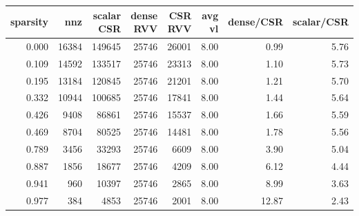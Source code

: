 \begin{tabular}{rrrrrrrr}
\toprule
sparsity & nnz & scalar CSR & dense RVV & CSR RVV & avg vl & dense/CSR & scalar/CSR \\
\midrule
0.000 & 16384 & 149645 & 25746 & 26001 & 8.00 & 0.99 & 5.76 \\
0.109 & 14592 & 133517 & 25746 & 23313 & 8.00 & 1.10 & 5.73 \\
0.195 & 13184 & 120845 & 25746 & 21201 & 8.00 & 1.21 & 5.70 \\
0.332 & 10944 & 100685 & 25746 & 17841 & 8.00 & 1.44 & 5.64 \\
0.426 & 9408 & 86861 & 25746 & 15537 & 8.00 & 1.66 & 5.59 \\
0.469 & 8704 & 80525 & 25746 & 14481 & 8.00 & 1.78 & 5.56 \\
0.789 & 3456 & 33293 & 25746 & 6609 & 8.00 & 3.90 & 5.04 \\
0.887 & 1856 & 18677 & 25746 & 4209 & 8.00 & 6.12 & 4.44 \\
0.941 & 960 & 10397 & 25746 & 2865 & 8.00 & 8.99 & 3.63 \\
0.977 & 384 & 4853 & 25746 & 2001 & 8.00 & 12.87 & 2.43 \\
\bottomrule
\end{tabular}
